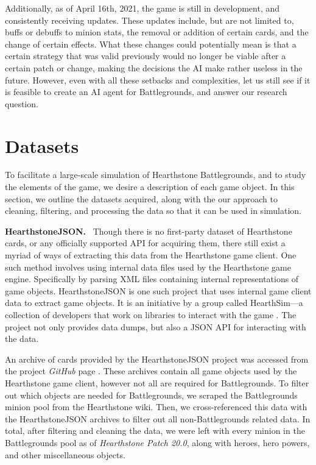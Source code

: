 \documentclass{paper}
\newcommand{\inlineSection}[1]{\vspace{0.5em}\noindent\textbf{#1.}~}
\begin{document}
Additionally, as of April 16th, 2021, the game is still in development, and consistently receiving updates. These updates include, but are not limited to, buffs or debuffs to minion stats, the removal or addition of certain cards, and the change of certain effects. What these changes could potentially mean is that a certain strategy that was valid previously would no longer be viable after a certain patch or change, making the decisions the AI make rather useless in the future. %
However, even with all these setbacks and complexities, let us still see if it is feasible to create an AI agent for Battlegrounds, and answer our research question. 

\section{Datasets}

To facilitate a large-scale simulation of Hearthstone Battlegrounds, and to study the elements of the game, we desire a description of each game object. In this section, we outline the datasets acquired, along with the our approach to cleaning, filtering, and processing the data so that it can be used in simulation.

\inlineSection{HearthstoneJSON} Though there is no first-party dataset of Hearthstone cards, or any officially supported API for acquiring them, there still exist a myriad of  ways of extracting this data from the Hearthstone game client. One such method involves using internal data files used by the Hearthstone game engine. Specifically by parsing XML files containing internal representations of game objects. HearthstoneJSON is one such project that uses internal game client data to extract game objects. It is an initiative by a group called HearthSim---a collection of developers that work on libraries to interact with the game \cite{}. The project not only provides data dumps, but also a JSON API for interacting with the data. 

An archive of cards provided by the HearthstoneJSON project was accessed from the project \textit{GitHub} page \cite{hearthstonejson}. These archives contain all game objects used by the Hearthstone game client, however not all are required for Battlegrounds. To filter out which objects are needed for Battlegrounds, we scraped the Battlegrounds minion pool from the Hearthstone wiki. Then, we cross-referenced this data with the HearthstoneJSON archives to filter out all non-Battlegrounds related data. In total, after filtering and cleaning the data, we were left with every minion in the Battlegrounds pool as of \textit{Hearthstone Patch 20.0}, along with heroes, hero powers, and other miscellaneous objects.
\end{document}
